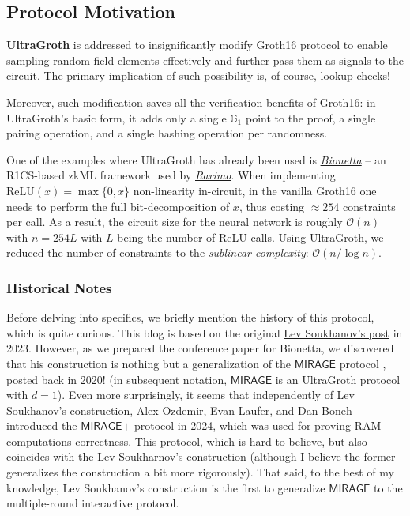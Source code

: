 \documentclass[../../book]{subfiles}
\begin{document}
\subsection{Protocol Motivation}

\textbf{UltraGroth} is addressed to insignificantly modify Groth16 protocol to
enable sampling random field elements effectively and further pass them as
signals to the circuit. The primary implication of such possibility is, of
course, lookup checks!

Moreover, such modification saves all the verification benefits of Groth16: in
UltraGroth's basic form, it adds only a single $\mathbb{G}_1$ point to the
proof, a single pairing operation, and a single hashing operation per
randomness. 

One of the examples where UltraGroth has already been used is
\href{https://mirror.xyz/0x90699B5A52BccbdFe73d5c9F3d039a33fb2D1AF6/T4lHiBlo7VoYp-5SEuitQnY7_ullpwkZbanOOwjeZI4}{\textit{Bionetta}}
-- an R1CS-based zkML framework used by
\href{https://rarimo.com/}{\textit{Rarimo}}. When implementing
$\text{ReLU}(x)=\max\{0,x\}$ non-linearity in-circuit, in the vanilla Groth16
one needs to perform the full bit-decomposition of $x$, thus costing $\approx
254$ constraints per call. As a result, the circuit size for the neural network
is roughly $\mathcal{O}(n)$ with $n=254L$ with $L$ being the number of ReLU
calls. Using UltraGroth, we reduced the number of constraints to the
\textit{sublinear complexity}: $\mathcal{O}(n/\log n)$.

\subsubsection{Historical Notes}

Before delving into specifics, we briefly mention the history of this protocol,
which is quite curious. This blog is based on the original
\href{https://hackmd.io/@Merlin404/Hy_O2Gi-h}{Lev Soukhanov's post} in 2023.
However, as we prepared the conference paper for Bionetta, we discovered that
his construction is nothing but a generalization of
the $\textsf{MIRAGE}$ protocol \cite{mirage}, posted back
in 2020! (in subsequent notation, $\textsf{MIRAGE}$ is an UltraGroth protocol
with $d=1$). Even more surprisingly, it seems that independently of Lev
Soukhanov's construction, Alex Ozdemir, Evan Laufer, and Dan Boneh introduced
the $\textsf{MIRAGE+}$ protocol \cite{mirageplus} in 2024,
which was used for proving RAM computations correctness. This protocol, which is
hard to believe, but also coincides with the Lev Soukharnov's construction
(although I believe the former generalizes the construction a bit more
rigorously). That said, to the best of my knowledge, Lev Soukhanov's
construction is the first to generalize $\textsf{MIRAGE}$ to the multiple-round
interactive protocol.
\end{document}
